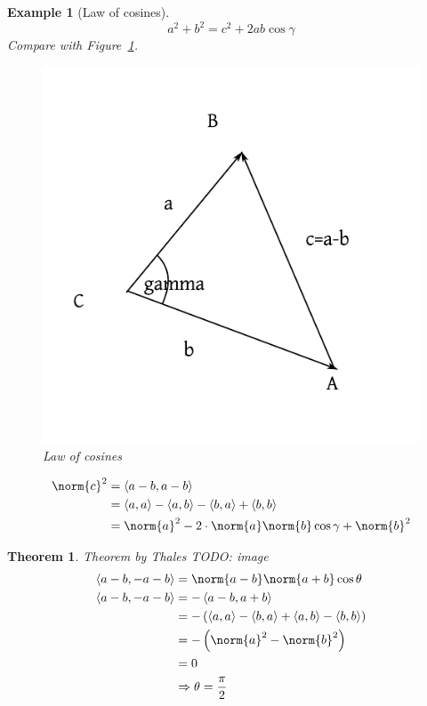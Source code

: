 \documentclass[a4paper,landscape,twocolumn]{article}
\newcommand\functional[1]{\left\langle{#1}\right\rangle}
\newtheorem{theorem}{Theorem}
\newtheorem{ex}{Example}
\DeclarePairedDelimiter\norm\lVert\rVert
\begin{document}
\begin{ex}[Law of cosines]
  \label{ex-8.5}
  \[ a^2 + b^2 = c^2 + 2ab \cos{\gamma} \]
  Compare with Figure~\ref{img:law-of-cosines}.
  \begin{figure}[!h]
    \begin{center}
      \includegraphics{img/law-of-cosines.pdf}
      \caption{Law of cosines}
      \label{img:law-of-cosines}
    \end{center}
  \end{figure}

  \begin{align*}
    \norm{c}^2 &= \functional{a-b, a-b} \\
      &= \functional{a,a} - \functional{a,b} - \functional{b,a} + \functional{b,b} \\
      &= \norm{a}^2 - 2 \cdot \norm{a} \norm{b} \cos{\gamma} + \norm{b}^2
  \end{align*}
\end{ex}

\begin{theorem}{Theorem by Thales}
  TODO: image
  \begin{align*}
    \functional{a-b, -a-b} &= \norm{a-b} \norm{a+b} \cos\theta \\
    \functional{a-b, -a-b} &= -\functional{a-b, a+b} \\
      &= -\left(\functional{a,a} - \functional{b,a} + \functional{a,b} - \functional{b,b}\right) \\
      &= -\left(\norm{a}^2 - \norm{b}^2\right) \\
      &= 0 \\
      &\Rightarrow \theta = \frac\pi2
  \end{align*}
\end{theorem}
\end{document}
